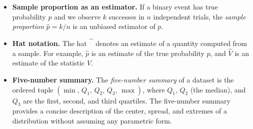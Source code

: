 \begin{itemize}
\item \textbf{Sample proportion as an estimator.} If a binary event has true probability $p$ and we observe $k$ successes in $n$ independent trials, the \textit{sample proportion} $\hat{p}=k/n$ is an unbiased estimator of $p$.

\item \textbf{Hat notation.} The hat $\hat{\phantom{V}}$ denotes an estimate of a quantity computed from a sample. For example, $\hat{p}$ is an estimate of the true probability $p$, and $\hat{V}$ is an estimate of the statistic $V$.

\item \textbf{Five-number summary.} The \textit{five-number summary} of a dataset is the ordered tuple $(\min,\, Q_1,\, Q_2,\, Q_3,\, \max)$, where $Q_1$, $Q_2$ (the median), and $Q_3$ are the first, second, and third quartiles. The five-number summary provides a concise description of the center, spread, and extremes of a distribution without assuming any parametric form.

\end{itemize}
